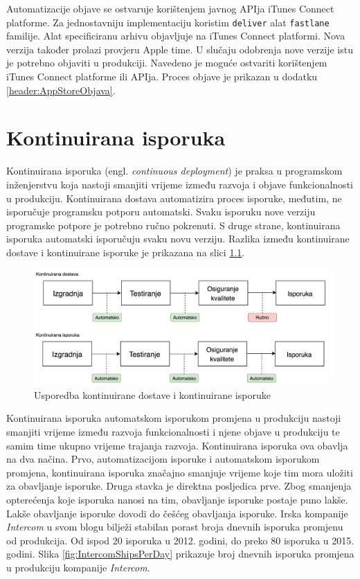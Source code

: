 \documentclass[times, utf8, diplomski, numeric]{fer}
\newcommand{\eng}[1]{(engl. \textit{#1})}
\begin{document}
Automatizacije objave se ostvaruje korištenjem javnog APIja iTunes Connect platforme. Za jednostavniju implementaciju koristim \verb|deliver| alat \verb|fastlane| familije. Alat specificiranu arhivu objavljuje na iTunes Connect platformi. Nova verzija također prolazi provjeru Apple time. U slučaju odobrenja nove verzije istu je potrebno objaviti u produkciji. Navedeno je moguće ostvariti korištenjem iTunes Connect platforme ili APIja. Proces objave je prikazan u dodatku \ref{header:AppStoreObjava}.



\chapter{Kontinuirana isporuka} \label{header:KontinuiranaIsporuka}

Kontinuirana isporuka \eng{continuous deployment} je praksa u programskom inženjerstvu koja nastoji smanjiti vrijeme između razvoja i objave funkcionalnosti u produkciju. Kontinuirana dostava automatizira proces isporuke, međutim, ne isporučuje programsku potporu automatski. Svaku isporuku nove verziju programske potpore je potrebno ručno pokrenuti. S druge strane, kontinuirana isporuka automatski isporučuju svaku novu verziju. Razlika između kontinuirane dostave i kontinuirane isporuke je prikazana na slici \ref{fig:CDDifferences}\citep{cd:whats_the_diff}.

\begin{figure}
\centering
\includegraphics[scale=0.55]{CDDifferences}
\caption{Usporedba kontinuirane dostave i kontinuirane isporuke}
\label{fig:CDDifferences}
\end{figure}

Kontinuirana isporuka automatskom isporukom promjena u produkciju nastoji smanjiti vrijeme između razvoja funkcionalnosti i njene objave u produkciju te samim time ukupno vrijeme trajanja razvoja. Kontinuirana isporuka ova obavlja na dva načina. Prvo, automatizacijom isporuke i automatskom isporukom promjena, kontinuirana isporuka značajno smanjuje vrijeme koje tim mora uložiti za obavljanje isporuke. Druga stavka je direktna posljedica prve. Zbog smanjenja opterećenja koje isporuka nanosi na tim, obavljanje isporuke postaje puno lakše. Lakše obavljanje isporuke dovodi do češćeg obavljanja isporuke. Irska kompanije \textit{Intercom} u svom blogu bilježi stabilan porast broja dnevnih isporuka promjenu od produkcija. Od ispod 20 isporuka u 2012. godini, do preko 80 isporuka u 2015. godini. Slika \ref{fig:IntercomShipsPerDay} prikazuje broj dnevnih isporuka promjena u produkciju kompanije \textit{Intercom}\citep{intercom:cd}.
\end{document}
